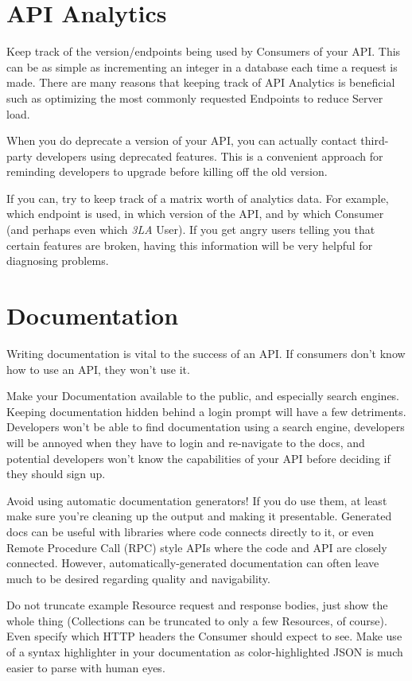 \documentclass{book}
\begin{document}
\section{API Analytics}

Keep track of the version/endpoints being used by Consumers of your API. This can be as simple as incrementing an integer in a database each time a request is made. There are many reasons that keeping track of API Analytics is beneficial such as optimizing the most commonly requested Endpoints to reduce Server load.

When you do deprecate a version of your API, you can actually contact third-party developers using deprecated features. This is a convenient approach for reminding developers to upgrade before killing off the old version.

If you can, try to keep track of a matrix worth of analytics data. For example, which endpoint is used, in which version of the API, and by which Consumer (and perhaps even which \emph{3LA} User). If you get angry users telling you that certain features are broken, having this information will be very helpful for diagnosing problems.


\section{Documentation}

Writing documentation is vital to the success of an API. If consumers don't know how to use an API, they won't use it.

Make your Documentation available to the public, and especially search engines. Keeping documentation hidden behind a login prompt will have a few detriments. Developers won't be able to find documentation using a search engine, developers will be annoyed when they have to login and re-navigate to the docs, and potential developers won't know the capabilities of your API before deciding if they should sign up.

Avoid using automatic documentation generators! If you do use them, at least make sure you're cleaning up the output and making it presentable. Generated docs can be useful with libraries where code connects directly to it, or even Remote Procedure Call (RPC) style APIs where the code and API are closely connected. However, automatically-generated documentation can often leave much to be desired regarding quality and navigability.

Do not truncate example Resource request and response bodies, just show the whole thing (Collections can be truncated to only a few Resources, of course). Even specify which HTTP headers the Consumer should expect to see. Make use of a syntax highlighter in your documentation as color-highlighted JSON is much easier to parse with human eyes.
\end{document}
